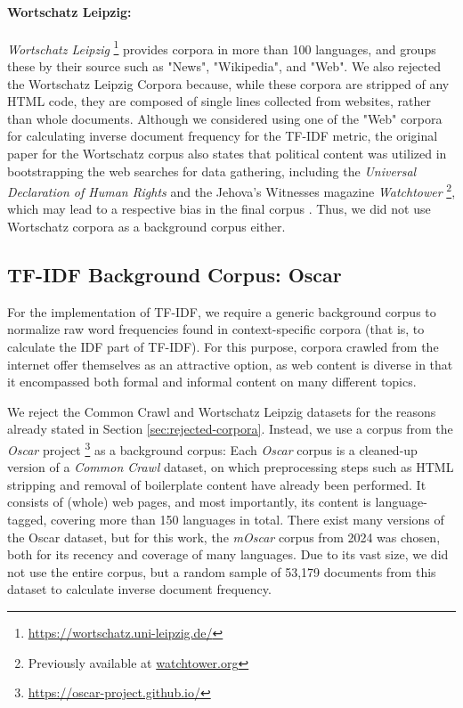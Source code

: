 \paragraph{Wortschatz Leipzig:}
\textit{Wortschatz Leipzig} \footnote{\url{https://wortschatz.uni-leipzig.de/}} provides corpora in more than 100 languages, and groups these by their source such as "News", "Wikipedia", and "Web".
We also rejected the Wortschatz Leipzig Corpora because, while these corpora are stripped of any HTML code, they are composed of single lines collected from websites, rather than whole documents.
Although we considered using one of the "Web" corpora for calculating inverse document frequency for the TF-IDF metric, the original paper for the Wortschatz corpus also states that political content was utilized in bootstrapping the web searches for data gathering, including the \textit{Universal Declaration of Human Rights} and the Jehova's Witnesses magazine \textit{Watchtower} \footnote{Previously available at \url{watchtower.org}}, which may lead to a respective bias in the final corpus \cite{goldhahnBuildingLargeMonolingual2012}.
Thus, we did not use Wortschatz corpora as a background corpus either.

\subsection{TF-IDF Background Corpus: Oscar} \label{sec:oscar}
For the implementation of TF-IDF, we require a generic background corpus to normalize raw word frequencies found in context-specific corpora (that is, to calculate the IDF part of TF-IDF).
For this purpose, corpora crawled from the internet offer themselves as an attractive option, as web content is diverse in that it encompassed both formal and informal content on many different topics.

We reject the Common Crawl and Wortschatz Leipzig datasets for the reasons already stated in Section \ref{sec:rejected-corpora}.
Instead, we use a corpus from the \textit{Oscar} project \footnote{\url{https://oscar-project.github.io/}} as a background corpus:
Each \textit{Oscar} corpus is a cleaned-up version of a \textit{Common Crawl} dataset, on which preprocessing steps such as HTML stripping and removal of boilerplate content have already been performed.
It consists of (whole) web pages, and most importantly, its content is language-tagged, covering more than 150 languages in total.
There exist many versions of the Oscar dataset, but for this work, the \textit{mOscar} \cite{futeralMOSCARLargescaleMultilingual2024} corpus from 2024 was chosen, both for its recency and coverage of many languages.
Due to its vast size, we did not use the entire corpus, but a random sample of 53,179 documents from this dataset to calculate inverse document frequency.

